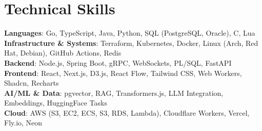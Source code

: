 \documentclass[a4paper,10pt]{article}
\begin{document}
\section{Technical Skills}
 \begin{itemize}[leftmargin=0.15in, label={}]
    \small{\item{
     \textbf{Languages}{: Go, TypeScript, Java, Python, SQL (PostgreSQL, Oracle), C, Lua} \\
     \textbf{Infrastructure \& Systems}{: Terraform, Kubernetes, Docker, Linux (Arch, Red Hat, Debian), GitHub Actions, Redis} \\
     \textbf{Backend}{: Node.js, Spring Boot, gRPC, WebSockets, PL/SQL, FastAPI} \\
     \textbf{Frontend}{: React, Next.js, D3.js, React Flow, Tailwind CSS, Web Workers, Shadcn, Recharts} \\
     \textbf{AI/ML \& Data}{: pgvector, RAG, Transformers.js, LLM Integration, Embeddings, HuggingFace Tasks} \\
     \textbf{Cloud}{: AWS (S3, EC2, ECS, S3, RDS, Lambda), Cloudflare Workers, Vercel, Fly.io, Neon}
    }}
 \end{itemize}
 
\end{document}
